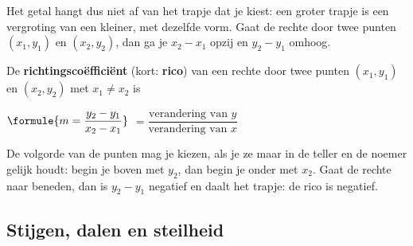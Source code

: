 Het getal hangt dus niet af van het trapje dat je kiest: een groter trapje is een vergroting van een kleiner, met dezelfde vorm. Gaat de rechte door twee punten $(x_1, y_1)$ en $(x_2, y_2)$, dan ga je $x_2 - x_1$ opzij en $y_2 - y_1$ omhoog.

\begin{theorie}
De \textbf{\textcolor{accent}{richtingscoëfficiënt}} (kort: \textbf{\textcolor{accent}{rico}}) van een rechte door twee punten $(x_1, y_1)$ en $(x_2, y_2)$ met $x_1 \neq x_2$ is

\vspace{1mm}
\qquad $\formule{m = \dfrac{y_2 - y_1}{x_2 - x_1}}$ \qquad $= \dfrac{\text{verandering van } y}{\text{verandering van } x}$
\end{theorie}

De volgorde van de punten mag je kiezen, als je ze maar in de teller en de noemer gelijk houdt: begin je boven met $y_2$, dan begin je onder met $x_2$. Gaat de rechte naar beneden, dan is $y_2 - y_1$ negatief en daalt het trapje: de rico is negatief.



\begin{oefeningen}
\end{oefeningen}

\subsection{Stijgen, dalen en steilheid}

